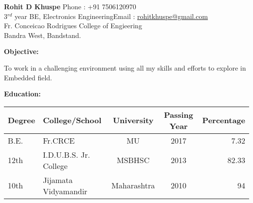\documentclass[a4paper]{article}
\begin{document}
	\begin{flushleft}
		\textbf{Rohit D Khuspe} \hfill{Phone : +91 7506120970}\\
		3$^{rd}$ year BE, Electronics Engineering\hfill{Email : \underline{rohitkhuspe@gmail.com}}\\
		Fr. Conceicao Rodrigues College of Engieering\\
		Bandra West, Bandstand.\\ \hline
		
			
	\end{flushleft}
	
	\vspace{-3mm}
 \begin{flushleft}
 	\begin{Large}\textbf{Objective:}\end{Large} \hspace{0.05in} To work in a challenging environment using all my skills and efforts to explore in Embedded field.\\
 	\begin{Large}\vspace{0.3in}\textbf{Education:}\end{Large}
 	\vspace{-3mm}
 	\begin{center}
 	\begin{tabular}{|l|l|c|c|r|}
 	\hline
 	Degree & College/School & University & Passing Year & Percentage\\ \hline
 
 	B.E. & Fr.CRCE & MU & 2017 & 7.32\\ \hline
 
 	12th & I.D.U.B.S. Jr. College & MSBHSC & 2013 & 82.33\\ \hline
 
	10th & Jijamata Vidyamandir & Maharashtra & 2010 & 94\\ \hline

 	\end{tabular}
 \end{center}
 	
 	
 	
 \end{flushleft}

	

	
\end{document}
